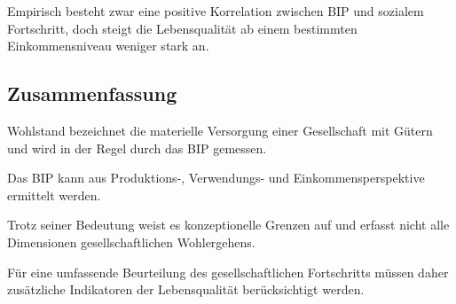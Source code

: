 Empirisch besteht zwar eine positive Korrelation zwischen BIP und sozialem Fortschritt, 
doch steigt die Lebensqualität ab einem bestimmten Einkommensniveau weniger stark an.

\subsection{Zusammenfassung}

Wohlstand bezeichnet die materielle Versorgung einer Gesellschaft mit Gütern 
und wird in der Regel durch das BIP gemessen. 

Das BIP kann aus Produktions-, Verwendungs- und Einkommensperspektive 
ermittelt werden. 

Trotz seiner Bedeutung weist es konzeptionelle Grenzen auf und erfasst 
nicht alle Dimensionen gesellschaftlichen Wohlergehens. 

Für eine umfassende Beurteilung des gesellschaftlichen Fortschritts 
müssen daher zusätzliche Indikatoren der Lebensqualität berücksichtigt werden.